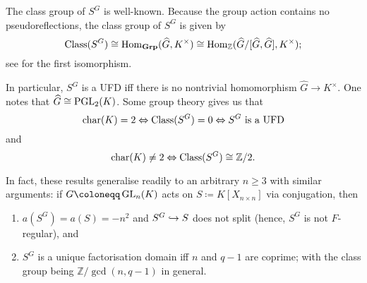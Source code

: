 \documentclass[12pt]{article}
\begin{document}
	The class group of $S^{G}$ is well-known. Because the group action contains no pseudoreflections, the class group of $S^{G}$ is given by
	\begin{equation*} 
		\operatorname{Class}(S^{G}) \cong \operatorname{Hom}_{\mathbf{Grp}}(\widehat{G}, K^{\times}) \cong \operatorname{Hom}_{\mathbb{Z}}(\widehat{G}/[\widehat{G}, \widehat{G}], K^{\times});
	\end{equation*}
	see \Cite[Theorem 3.9.2]{Benson:PolynomialInvariantsBook} for the first isomorphism.

	In particular, $S^{G}$ is a UFD iff there is no nontrivial homomorphism $\widehat{G} \to K^{\times}$. 
	One notes that $\widehat{G} \cong \operatorname{PGL}_{2}(K)$. 
	Some group theory gives us that
	\begin{equation*} 
		\operatorname{char}(K) = 2 \Leftrightarrow \operatorname{Class}(S^{G}) = 0 \Leftrightarrow \text{$S^{G}$ is a UFD} 
	\end{equation*}
	and
	\begin{equation*} 
		\operatorname{char}(K) \neq 2 \Leftrightarrow \operatorname{Class}(S^{G}) \cong \mathbb{Z}/2.
	\end{equation*}

	In fact, these results generalise readily to an arbitrary $n \ge 3$ with similar arguments: 
	if $G \coloneqq \GL_{n}(K)$ acts on $S \coloneqq K[X_{n \times n}]$ via conjugation, then
	\begin{enumerate}[label=(\alph*)]
		\item $a(S^{G}) = a(S) = -n^{2}$ and $S^{G} \hookrightarrow S$ does not split (hence, $S^{G}$ is not $F$-regular), and
		\item $S^{G}$ is a unique factorisation domain iff $n$ and $q - 1$ are coprime; with the class group being $\mathbb{Z}/\gcd(n, q - 1)$ in general.
	\end{enumerate}

\printbibliography
\end{document}
